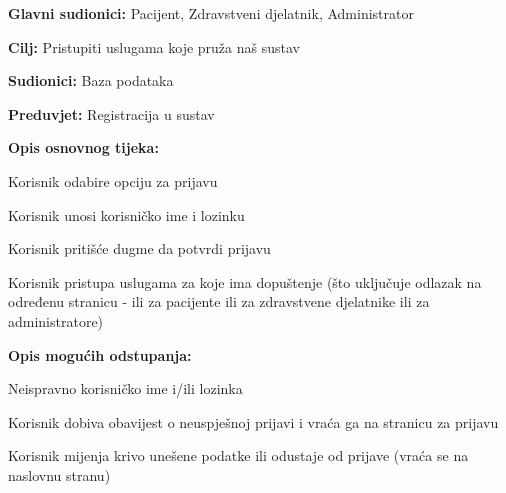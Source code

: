 \noindent {}
\begin{packed_item}
	
	\item \textbf{Glavni sudionici: }Pacijent, Zdravstveni djelatnik, Administrator
	\item  \textbf{Cilj:} Pristupiti uslugama koje pruža naš sustav
	\item  \textbf{Sudionici:} Baza podataka
	\item  \textbf{Preduvjet:} Registracija u sustav
	\item  \textbf{Opis osnovnog tijeka:}
	
	\item[] \begin{packed_enum}
		
		\item Korisnik odabire opciju za prijavu
		\item Korisnik unosi korisničko ime i lozinku
		\item Korisnik pritišće dugme da potvrdi prijavu
		\item Korisnik pristupa uslugama za koje ima dopuštenje (što uključuje odlazak na određenu stranicu - ili za pacijente ili za zdravstvene djelatnike ili za administratore)
	\end{packed_enum}
	
	\item  \textbf{Opis mogućih odstupanja:}
	
	\item[] \begin{packed_item}
		
		\item[2.a] Neispravno korisničko ime i/ili lozinka
		\item[] \begin{packed_enum}
			
			\item Korisnik dobiva obavijest o neuspješnoj prijavi i vraća ga na stranicu za prijavu
			\item Korisnik mijenja krivo unešene podatke ili odustaje od prijave (vraća se na naslovnu stranu)
			
		\end{packed_enum}
		
	\end{packed_item}
\end{packed_item}

